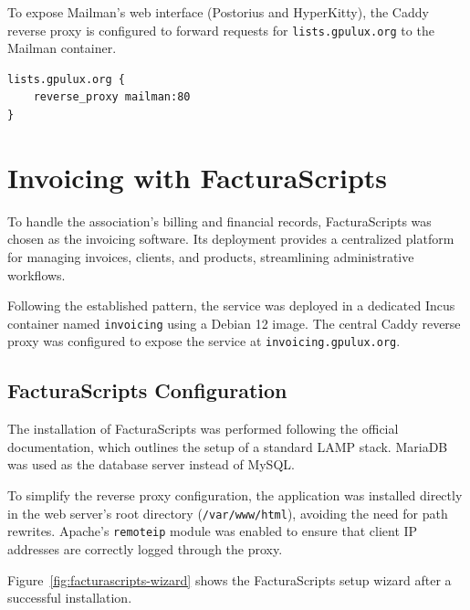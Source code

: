 To expose Mailman's web interface (Postorius and HyperKitty), the Caddy reverse proxy is configured to forward requests for \texttt{lists.gpulux.org} to the Mailman container.

\begin{lstlisting}[caption={Caddyfile configuration to reverse proxy Mailman 3.}]
lists.gpulux.org {
    reverse_proxy mailman:80
}
\end{lstlisting}

\section{Invoicing with FacturaScripts}

To handle the association's billing and financial records, FacturaScripts was chosen as the invoicing software. Its deployment provides a centralized platform for managing invoices, clients, and products, streamlining administrative workflows.

Following the established pattern, the service was deployed in a dedicated Incus container named \texttt{invoicing} using a Debian 12 image. The central Caddy reverse proxy was configured to expose the service at \texttt{invoicing.gpulux.org}.

\subsection*{FacturaScripts Configuration}

The installation of FacturaScripts was performed following the official documentation\cite{facturascripts-install-linux}, which outlines the setup of a standard LAMP stack. MariaDB was used as the database server instead of MySQL.

To simplify the reverse proxy configuration, the application was installed directly in the web server's root directory (\texttt{/var/www/html}), avoiding the need for path rewrites. Apache's \texttt{remoteip} module was enabled to ensure that client IP addresses are correctly logged through the proxy.

Figure~\ref{fig:facturascripts-wizard} shows the FacturaScripts setup wizard after a successful installation.

